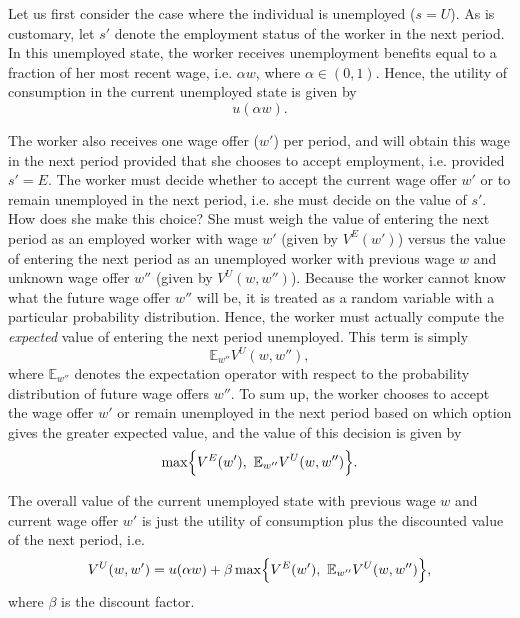 Let us first consider the case where the individual is unemployed ($s = U$). As is customary, let $s'$ denote the
employment status of the worker in the next period.
In this unemployed state, the worker receives unemployment benefits equal to a fraction of her most recent wage,
i.e. $\alpha w$, where $\alpha \in (0, 1)$.
Hence, the utility of consumption in the current unemployed state is given by
\[
u(\alpha w).
\]

The worker also receives one wage offer ($w'$) per period, and will obtain
this wage in the next period provided that she chooses to accept employment, i.e. provided $s' = E$.
The worker must decide whether to accept the current wage offer $w'$ or to remain unemployed in the next period,
i.e. she must decide on the value of $s'$. How
does she make this choice? She must weigh the value of entering the next period as an employed worker with wage
$w'$ (given by $V^E(w')$) versus the value of entering the next period as an unemployed worker with
previous wage $w$ and unknown wage offer $w''$ (given by $V^U(w,w'')$). Because the worker cannot know
what the future wage offer $w''$ will be, it is treated as a random variable with a particular probability
distribution. Hence, the worker must actually compute the \emph{expected} value of entering the next
period unemployed. This term is simply
\[
\mathbb{E}_{w''}V^U(w,w''),
\]
where $\mathbb{E}_{w''}$ denotes the expectation operator with respect to the probability distribution of future
wage offers $w''$.
To sum up, the worker chooses to accept the wage offer $w'$ or remain unemployed in the next period based on
which option gives the greater expected value, and the value of this decision is given by
\[
\max\Bigl\{V^E(w'), \,\, \mathbb{E}_{w''}V^U(w,w'')\Bigr\}.
\]

The overall value of the current unemployed state with previous wage $w$ and current wage offer $w'$ is
just the utility of consumption plus the discounted value of the next period, i.e.
\begin{equation}\label{EqVu}
V^U(w,w') = u(\alpha w) + \beta \max\Bigl\{V^E(w'), \,\, \mathbb{E}_{w''}V^U(w,w'')\Bigr\},
\end{equation}
where $\beta$ is the discount factor.

